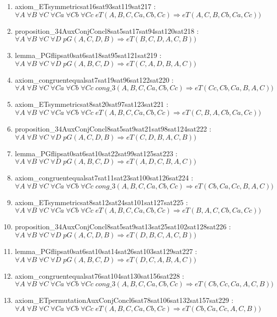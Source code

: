\documentclass{article}
\begin{document}
\begin{enumerate}
\item axiom\_ETsymmetricsat16sat93sat119sat217 : $\forall A\;\forall B\;\forall C\;\forall Ca\;\forall Cb\;\forall Cc\;eT(A, B, C, Ca, Cb, Cc) \Rightarrow eT(A, C, B, Cb, Ca, Cc))$
\item proposition\_34AuxConjConcl8sat5sat17sat94sat120sat218 : $\forall A\;\forall B\;\forall C\;\forall D\;pG(A, C, D, B) \Rightarrow eT(B, C, D, A, C, B))$
\item lemma\_PGflipsat0sat6sat18sat95sat121sat219 : $\forall A\;\forall B\;\forall C\;\forall D\;pG(A, B, C, D) \Rightarrow eT(C, A, D, B, A, C))$
\item axiom\_congruentequalsat7sat19sat96sat122sat220 : $\forall A\;\forall B\;\forall C\;\forall Ca\;\forall Cb\;\forall Cc\;cong\_3(A, B, C, Ca, Cb, Cc) \Rightarrow eT(Cc, Cb, Ca, B, A, C))$
\item axiom\_ETsymmetricsat8sat20sat97sat123sat221 : $\forall A\;\forall B\;\forall C\;\forall Ca\;\forall Cb\;\forall Cc\;eT(A, B, C, Ca, Cb, Cc) \Rightarrow eT(C, B, A, Cb, Ca, Cc))$
\item proposition\_34AuxConjConcl8sat5sat9sat21sat98sat124sat222 : $\forall A\;\forall B\;\forall C\;\forall D\;pG(A, C, D, B) \Rightarrow eT(C, D, B, A, C, B))$
\item lemma\_PGflipsat0sat6sat10sat22sat99sat125sat223 : $\forall A\;\forall B\;\forall C\;\forall D\;pG(A, B, C, D) \Rightarrow eT(A, D, C, B, A, C))$
\item axiom\_congruentequalsat7sat11sat23sat100sat126sat224 : $\forall A\;\forall B\;\forall C\;\forall Ca\;\forall Cb\;\forall Cc\;cong\_3(A, B, C, Ca, Cb, Cc) \Rightarrow eT(Cb, Ca, Cc, B, A, C))$
\item axiom\_ETsymmetricsat8sat12sat24sat101sat127sat225 : $\forall A\;\forall B\;\forall C\;\forall Ca\;\forall Cb\;\forall Cc\;eT(A, B, C, Ca, Cb, Cc) \Rightarrow eT(B, A, C, Cb, Ca, Cc))$
\item proposition\_34AuxConjConcl8sat5sat9sat13sat25sat102sat128sat226 : $\forall A\;\forall B\;\forall C\;\forall D\;pG(A, C, D, B) \Rightarrow eT(D, B, C, A, C, B))$
\item lemma\_PGflipsat0sat6sat10sat14sat26sat103sat129sat227 : $\forall A\;\forall B\;\forall C\;\forall D\;pG(A, B, C, D) \Rightarrow eT(D, C, A, B, A, C))$
\item axiom\_congruentequalsat76sat104sat130sat156sat228 : $\forall A\;\forall B\;\forall C\;\forall Ca\;\forall Cb\;\forall Cc\;cong\_3(A, B, C, Ca, Cb, Cc) \Rightarrow eT(Cb, Cc, Ca, A, C, B))$
\item axiom\_ETpermutationAuxConjConcl6sat78sat106sat132sat157sat229 : $\forall A\;\forall B\;\forall C\;\forall Ca\;\forall Cb\;\forall Cc\;eT(A, B, C, Ca, Cb, Cc) \Rightarrow eT(Cb, Ca, Cc, A, C, B))$

\end{enumerate}
\end{document}
